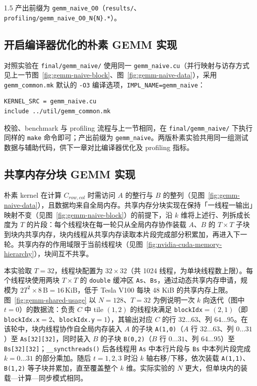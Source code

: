 \documentclass[zihao=-4]{ctexart}
\begin{document}
\begin{spacing}{1.5}
产出前缀为 \protect\texttt{gemm\_naive\_O0}（\protect\texttt{results/}、\protect\texttt{profiling/gemm\_naive\_O0\_N\{N\}.*}）。

\subsection{开启编译器优化的朴素 GEMM 实现}

对照实验在 \protect\texttt{final/gemm\_naive/} 使用同一 \protect\texttt{gemm\_naive.cu}（并行映射与访存方式见上一节图~\ref{fig:gemm-naive-block}、图~\ref{fig:gemm-naive-data}），采用 \protect\texttt{gemm\_common.mk} 默认的 \protect\texttt{-O3} 编译选项，\protect\texttt{IMPL\_NAME=gemm\_naive}：

\begin{lstlisting}[caption={O3 目录 Makefile（\protect\texttt{gemm\_naive/Makefile}）}]
KERNEL_SRC = gemm_naive.cu
include ../util/gemm_common.mk
\end{lstlisting}

校验、benchmark 与 profiling 流程与上一节相同，在 \protect\texttt{final/gemm\_naive/} 下执行同样的 \protect\texttt{make} 命令即可；产出前缀为 \protect\texttt{gemm\_naive}。两版朴素实验共用同一组测试数据与辅助代码，供下一章对比编译器优化及 profiling 指标。

\subsection{共享内存分块 GEMM 实现}

朴素 kernel 在计算 $C_{row,col}$ 时需访问 $A$ 的整行与 $B$ 的整列（见图~\ref{fig:gemm-naive-data}），且数据均来自全局内存。共享内存分块实现在保持「一线程一输出」映射不变（见图~\ref{fig:gemm-naive-block}）的前提下，沿 $k$ 维将上述行、列拆成长度为 $T$ 的片段：每个线程块在每一轮只从全局内存协作装载 $A$、$B$ 的 $T\times T$ 子块到块内共享内存，块内线程从共享内存读取本片段完成部分积累加，再进入下一轮。共享内存的作用域限于当前线程块（见图~\ref{fig:nvidia-cuda-memory-hierarchy}），块间互不共享。

本实验取 $T=32$，线程块配置为 $32\times32$（共 1024 线程，为单块线程数上限）。每个线程块使用两块 $T\times T$ 的 \protect\texttt{double} 缓冲区 \protect\texttt{As}、\protect\texttt{Bs}，通过动态共享内存申请，规模为 $2T^2\times 8\,\mathrm{B}=16\,\mathrm{KiB}$，低于 Tesla V100 每块 48 KiB 的共享内存上限。图~\ref{fig:gemm-shared-usage} 以 $N=128$、$T=32$ 为例说明一次 $k$ 向迭代（图中 $t=0$）的数据流：负责 $C$ 中 tile $(1,2)$ 的线程块满足 \protect\texttt{blockIdx}$=(2,1)$（即 \protect\texttt{blockIdx.x}$=2$、\protect\texttt{blockIdx.y}$=1$），其输出对应 $C$ 的行 $32\ldots63$、列 $64\ldots95$。在该轮中，块内线程协作自全局内存装入 $A$ 的子块 \protect\texttt{A(1,0)}（$A$ 行 $32\ldots63$、列 $0\ldots31$）至 \protect\texttt{As[32][32]}，同时装入 $B$ 的子块 \protect\texttt{B(0,2)}（$B$ 行 $0\ldots31$、列 $64\ldots95$）至 \protect\texttt{Bs[32][32]}；\protect\texttt{\_\_syncthreads()} 后各线程用 \protect\texttt{As} 中本行片段与 \protect\texttt{Bs} 中本列片段完成 $k=0\ldots31$ 的部分乘加。随后 $t=1,2,3$ 时沿 $k$ 轴右移/下移，依次装载 \protect\texttt{A(1,1)}、\protect\texttt{B(1,2)} 等子块并累加，直至覆盖整个 $k$ 维。实际实验的 $N$ 更大，但单块内的装载—计算—同步模式相同。


\end{spacing}
\end{document}
